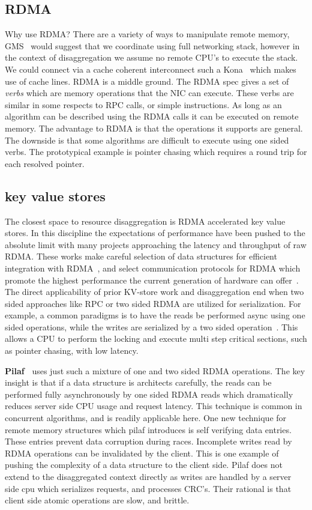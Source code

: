 
\subsection{RDMA}

Why use RDMA? There are a variety of ways to manipulate remote memory,
GMS~\cite{gms} would suggest that we coordinate using full networking stack,
however in the context of disaggregation we assume no remote CPU's to execute
the stack. We could connect via a cache coherent interconnect such a
Kona~\cite{kona} which makes use of cache lines. RDMA is a middle ground. The
RDMA spec gives a set of \textit{verbs} which are memory operations that the NIC
can execute. These verbs are similar in some respects to RPC calls, or simple
instructions. As long as an algorithm can be described using the RDMA calls it
can be executed on remote memory. The advantage to RDMA is that the operations
it supports are general. The downside is that some algorithms are difficult to
execute using one sided verbs. The prototypical example is pointer chasing
which requires a round trip for each resolved pointer.


\subsection{key value stores} 
The closest space to resource disaggregation is RDMA accelerated key value
stores. In this discipline the expectations of performance have been pushed to
the absolute limit with many projects approaching the latency and throughput of
raw RDMA. These works make careful selection of data structures for efficient
integration with RDMA~\cite{hopscotch,cuckoo}, and select communication
protocols for RDMA which promote the highest performance the current generation
of hardware can offer~\cite{herd,storm}. The direct applicability of prior
KV-store work and disaggregation end when two sided approaches like RPC or two
sided RDMA are utilized for serialization. For example, a common paradigms is to
have the reads be performed async using one sided operations, while the writes
are serialized by a two sided operation~\cite{pilaf}. This allows a CPU to
perform the locking and execute multi step critical sections, such as pointer
chasing, with low latency.

\textbf{Pilaf~\cite{pilaf}} uses just such a mixture of one and two sided RDMA
operations. The key insight is that if a data structure is architects carefully,
the reads can be performed fully asynchronously by one sided RDMA reads which
dramatically reduces server side CPU usage and request latency. This technique
is common in concurrent algorithms, and is readily applicable here. One new
technique for remote memory structures which pilaf introduces is self verifying
data entries. These entries prevent data corruption during races. Incomplete
writes read by RDMA operations can be invalidated by the client. This is one
example of pushing the complexity of a data structure to the client side. Pilaf
does not extend to the disaggregated context directly as writes are handled by a
server side cpu which serializes requests, and processes CRC's. Their rational
is that client side atomic operations are slow, and brittle. 

